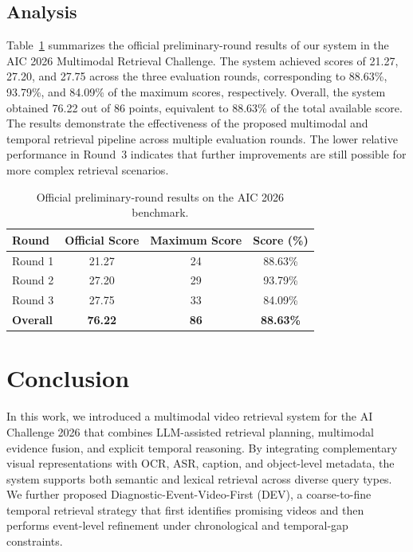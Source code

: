 \documentclass[runningheads]{llncs}
\begin{document}
\subsection{Analysis}
Table~\ref{tab:official-results} summarizes the official preliminary-round
results of our system in the AIC 2026 Multimodal Retrieval Challenge.
The system achieved scores of 21.27, 27.20, and 27.75 across the three
evaluation rounds, corresponding to 88.63\%, 93.79\%, and 84.09\% of
the maximum scores, respectively. Overall, the system obtained
76.22 out of 86 points, equivalent to 88.63\% of the total available
score. The results demonstrate the effectiveness of the proposed
multimodal and temporal retrieval pipeline across multiple evaluation
rounds. The lower relative performance in Round~3 indicates that
further improvements are still possible for more complex retrieval
scenarios.

\begin{table}[t]
\centering
\caption{Official preliminary-round results on the AIC 2026 benchmark.}
\label{tab:official-results}
\small
\begin{tabular}{lccc}
\hline
\textbf{Round} & \textbf{Official Score} & \textbf{Maximum Score} & \textbf{Score (\%)} \\
\hline
Round 1 & 21.27 & 24 & 88.63\% \\
Round 2 & 27.20 & 29 & 93.79\% \\
Round 3 & 27.75 & 33 & 84.09\% \\
\hline
\textbf{Overall} & \textbf{76.22} & \textbf{86} & \textbf{88.63\%} \\
\hline
\end{tabular}
\end{table}



\section{Conclusion}
\label{sec:conclusion}

In this work, we introduced a multimodal video retrieval system for the AI Challenge 2026 that combines LLM-assisted retrieval planning, multimodal evidence fusion, and explicit temporal reasoning. By integrating complementary visual representations with OCR, ASR, caption, and object-level metadata, the system supports both semantic and lexical retrieval across diverse query types. We further proposed Diagnostic-Event-Video-First (DEV), a coarse-to-fine temporal retrieval strategy that first identifies promising videos and then performs event-level refinement under chronological and temporal-gap constraints.
\end{document}
